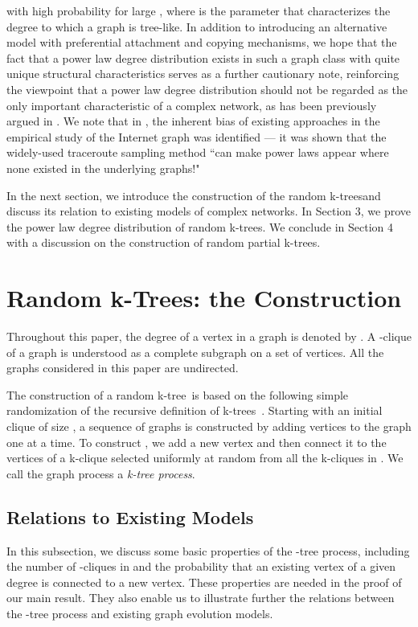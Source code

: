\documentclass[11pt]{article}
\providecommand{\ktree}{k-tree}
\providecommand{\ktrees}{k-trees}
\begin{document}
with high probability for large , where  is the parameter that characterizes the degree to which a graph is tree-like.
In addition to introducing an alternative model with preferential attachment and copying mechanisms, we hope that
the fact that a power law degree distribution exists in such a graph class with quite unique structural characteristics
serves as a further cautionary note, reinforcing the viewpoint that a power law degree distribution should not be regarded as
the only important characteristic of a complex network, as has been previously argued in \cite{li05,mitzenmacher05}. We note that in \cite{dimitris05power}, 
the inherent bias of existing approaches in the empirical study of 
the Internet graph was identified --- it was shown that the widely-used 
traceroute sampling method ``can make power laws appear where none existed in
the underlying graphs!" 






In the next section, we introduce the construction of the random \ktrees and discuss its relation to existing models of complex networks.
In Section 3, we prove the power law degree distribution of random \ktrees.
We conclude in Section 4 
with a discussion on the construction of random partial \ktrees.


\section{Random k-Trees: the Construction}

Throughout this paper, the degree of a vertex  in a graph  is denoted by .  A -clique of a graph is understood as a complete subgraph on a set of  vertices. All the graphs considered in this paper are undirected. 


The construction of a random \ktree\ is based on the following simple randomization of the recursive definition of \ktrees\ \cite{kloks94}.
Starting with an initial clique  of size , a sequence of graphs  is constructed by adding vertices to the graph one at a time.
To construct , we add a new vertex  and then connect it to the  vertices of a k-clique selected
uniformly at random from all the k-cliques in .
We call the graph process  a \textit{k-tree process}.

\subsection{Relations to Existing Models}
In this subsection, we discuss some basic properties of the -tree process, 
including the number of -cliques in  and the probability 
that an existing vertex of a given degree is connected to a new vertex. These properties 
are needed in the proof of  our main result. They also enable us to illustrate further the relations between the -tree process and existing graph evolution models.     
\end{document}
